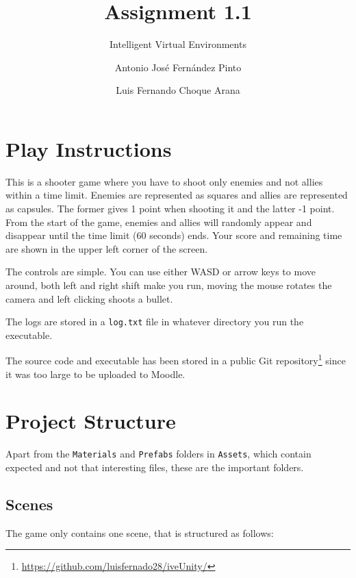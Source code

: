 \documentclass[
	emulatestandardclasses, %
	11pt,
	a4paper,
	toc=bib, %
	parskip=half-,
	numbers=endperiod,
]{scrartcl}
\title{Assignment 1.1}
\subtitle{Intelligent Virtual Environments}
\author{Antonio José Fernández Pinto \and Luis Fernando Choque Arana}
\date{} %
\begin{document}
\maketitle[0]

\vspace{-1cm}

\section{Play Instructions}

This is a shooter game where you have to shoot only enemies and not allies within a time limit. Enemies are represented as squares and allies are represented as capsules. The former gives 1 point when shooting it and the latter -1 point. From the start of the game, enemies and allies will randomly appear and disappear until the time limit (60 seconds) ends. Your score and remaining time are shown in the upper left corner of the screen.

The controls are simple. You can use either WASD or arrow keys to move around, both left and right shift make you run, moving the mouse rotates the camera and left clicking shoots a bullet.

The logs are stored in a \texttt{log.txt} file in whatever directory you run the executable.

The source code and executable has been stored in a public Git repository\footnote{\url{https://github.com/luisfernado28/iveUnity/}} since it was too large to be uploaded to Moodle.

\section{Project Structure}

Apart from the \texttt{Materials} and \texttt{Prefabs} folders in \texttt{Assets}, which contain expected and not that interesting files, these are the important folders.

\subsection{Scenes}

The game only contains one scene, that is structured as follows:
\end{document}
